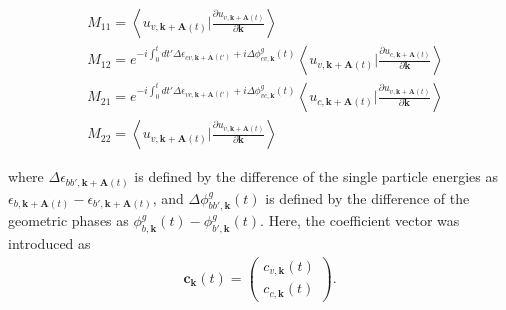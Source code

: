\begin{align}
	 & M_{11} = \left \langle u_{v,\mathbf k+\mathbf A(t)}\Big |\frac{\partial u_{v,\mathbf k+\mathbf
	A(t)}}{\partial \mathbf k} \right \rangle                                                                                                   \\
	 & M_{12} = e^{-i\int^t_0dt' \Delta \epsilon_{cv,\mathbf k+ \mathbf A(t')}+i \Delta \phi^g_{cv,\mathbf k}(t)}
	\left \langle u_{v,\mathbf k+\mathbf A(t)}\Big |\frac{\partial u_{c,\mathbf k+\mathbf A(t)}}{\partial
	\mathbf k} \right \rangle                                                                                                                   \\
	 & M_{21} = e^{-i\int^t_0dt' \Delta \epsilon_{vc,\mathbf k+ \mathbf A(t')}+i \Delta \phi^g_{vc,\mathbf k}(t)}
	\left \langle u_{c,\mathbf k+\mathbf A(t)}\Big |\frac{\partial u_{v,\mathbf k+\mathbf A(t)}}{\partial
	\mathbf k} \right \rangle                                                                                                                   \\
	 & M_{22} = \left \langle u_{v,\mathbf k+\mathbf A(t)}\Big |\frac{\partial u_{v,\mathbf k+\mathbf A(t)}}{\partial \mathbf k} \right \rangle
\end{align}

where $\Delta\epsilon_{bb',\mathbf k+ \mathbf A(t)}$ is defined by the difference of the single particle energies as $\epsilon_{b,\mathbf k+ \mathbf A(t)}-\epsilon_{b',\mathbf k+ \mathbf A(t)}$, and $\Delta \phi^g_{bb',\mathbf k}(t)$ is defined by the difference of the geometric phases as $\phi^g_{b,\mathbf k}(t)-\phi^g_{b',\mathbf k}(t)$. Here, the coefficient vector was introduced as
\begin{align}
	\mathbf c_{\mathbf k}(t) = \left(
	\begin{array}{cc}
			c_{v,\mathbf k}(t) \\
			c_{c,\mathbf k}(t)
		\end{array}
	\right).
\end{align}

